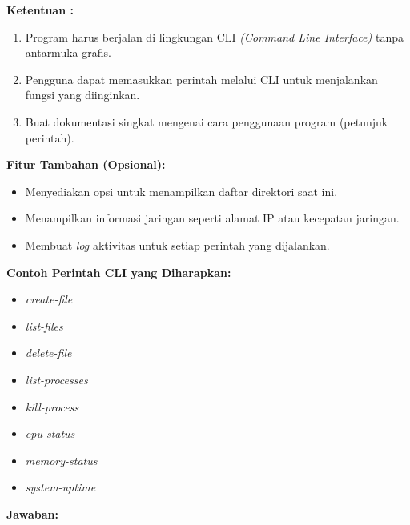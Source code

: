 \documentclass[12pt]{article}
\begin{document}
\par \textbf{Ketentuan :}
\begin{enumerate}
    \item Program harus berjalan di lingkungan CLI \textit{(Command Line Interface)} tanpa antarmuka grafis.
    \item Pengguna dapat memasukkan perintah melalui CLI untuk menjalankan fungsi yang diinginkan.
    \item Buat dokumentasi singkat mengenai cara penggunaan program (petunjuk perintah).
\end{enumerate}
\par \textbf{Fitur Tambahan (Opsional):}
\begin{itemize}
    \item Menyediakan opsi untuk menampilkan daftar direktori saat ini.
    \item Menampilkan informasi jaringan seperti alamat IP atau kecepatan jaringan.
    \item Membuat \textit{log} aktivitas untuk setiap perintah yang dijalankan.
\end{itemize}
\par \textbf{Contoh Perintah CLI yang Diharapkan:}
\begin{itemize}
    \item \textit{create-file} 
    \item \textit{list-files}
    \item \textit{delete-file} 
    \item \textit{list-processes}
    \item \textit{kill-process} 
    \item \textit{cpu-status}
    \item \textit{memory-status}
    \item \textit{system-uptime}
\end{itemize}
\par \textbf{Jawaban:}
\end{document}
